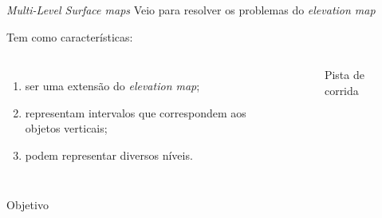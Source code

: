 \begin{frame}[t]{\textit{Multi-Level Surface maps}} 
    \transdissolve[duration=0.5]
    Veio para resolver os problemas do \textit{elevation map}
    
    Tem como características:
        \begin{columns}[t]
                \begin{enumerate}
                    \item ser uma extensão do \textit{elevation map};
                    \item representam intervalos que correspondem aos objetos verticais;
                    \item podem representar diversos níveis.
                \end{enumerate}
            \begin{center}
                \begin{figure}
                    \caption{Pista de corrida \cite{agostini2007}}
                \end{figure}
            \end{center}
        \end{columns}
\end{frame}

\begin{frame}[c]{Objetivo} 
    \transdissolve[duration=0.5]
   
    \begin{center}
    \end{center}
    
   
\end{frame}


